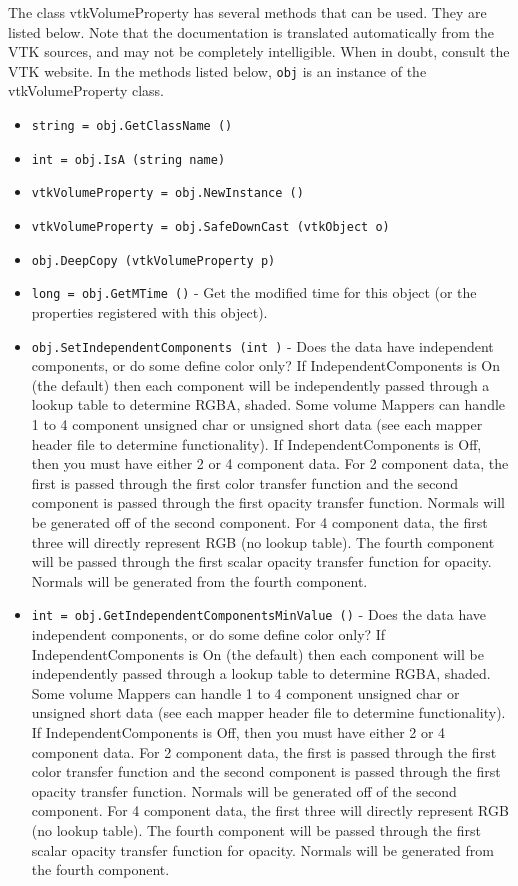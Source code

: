 The class vtkVolumeProperty has several methods that can be used.
  They are listed below.
Note that the documentation is translated automatically from the VTK sources,
and may not be completely intelligible.  When in doubt, consult the VTK website.
In the methods listed below, \verb|obj| is an instance of the vtkVolumeProperty class.
\begin{itemize}
\item  \verb|string = obj.GetClassName ()|

\item  \verb|int = obj.IsA (string name)|

\item  \verb|vtkVolumeProperty = obj.NewInstance ()|

\item  \verb|vtkVolumeProperty = obj.SafeDownCast (vtkObject o)|

\item  \verb|obj.DeepCopy (vtkVolumeProperty p)|

\item  \verb|long = obj.GetMTime ()| -  Get the modified time for this object (or the properties registered
 with this object).

\item  \verb|obj.SetIndependentComponents (int )| -  Does the data have independent components, or do some define color 
 only? If IndependentComponents is On (the default) then each component 
 will be independently passed through a lookup table to determine RGBA, 
 shaded. Some volume Mappers can handle 1 to 4 component 
 unsigned char or unsigned short data (see each mapper header file to
 determine functionality). If IndependentComponents is Off, then you 
 must have either 2 or 4 component data. For 2 component data, the 
 first is passed through the first color transfer function and the 
 second component is passed through the first opacity transfer function. 
 Normals will be generated off of the second component. For 4 component 
 data, the first three will directly represent RGB (no lookup table). 
 The fourth component will be passed through the first scalar opacity 
 transfer function for opacity. Normals will be generated from the fourth 
 component.

\item  \verb|int = obj.GetIndependentComponentsMinValue ()| -  Does the data have independent components, or do some define color 
 only? If IndependentComponents is On (the default) then each component 
 will be independently passed through a lookup table to determine RGBA, 
 shaded. Some volume Mappers can handle 1 to 4 component 
 unsigned char or unsigned short data (see each mapper header file to
 determine functionality). If IndependentComponents is Off, then you 
 must have either 2 or 4 component data. For 2 component data, the 
 first is passed through the first color transfer function and the 
 second component is passed through the first opacity transfer function. 
 Normals will be generated off of the second component. For 4 component 
 data, the first three will directly represent RGB (no lookup table). 
 The fourth component will be passed through the first scalar opacity 
 transfer function for opacity. Normals will be generated from the fourth 
 component.


\end{itemize}
